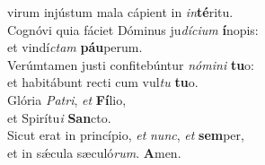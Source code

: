 \evenverse virum injústum mala cápient in \textit{in}\textbf{té}ritu.\\
\oddverse Cognóvi quia fáciet Dóminus ju\textit{dí}\textit{ci}\textit{um} \textbf{í}nopis:~\*\\
\oddverse et vindí\textit{ctam} \textbf{páu}perum.\\
\evenverse Verúmtamen justi confitebúntur \textit{nó}\textit{mi}\textit{ni} \textbf{tu}o:~\*\\
\evenverse et habitábunt recti cum vul\textit{tu} \textbf{tu}o.\\
\oddverse Glória \textit{Pa}\textit{tri}, \textit{et} \textbf{Fí}lio,~\*\\
\oddverse et Spirítu\textit{i} \textbf{San}cto.\\
\evenverse Sicut erat in princípio, \textit{et} \textit{nunc}, \textit{et} \textbf{sem}per,~\*\\
\evenverse et in sǽcula sæculó\textit{rum}. \textbf{A}men.\\
